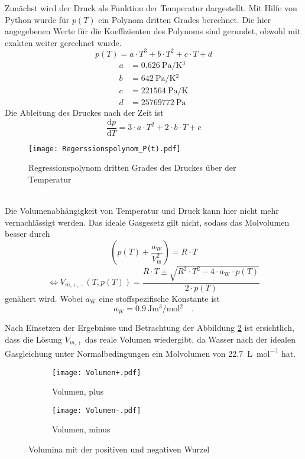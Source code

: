 Zunächst wird der Druck als Funktion der Temperatur dargestellt. Mit Hilfe von Python wurde für $p(T)$ ein Polynom dritten Grades berechnet. Die hier angegebenen Werte für die Koeffizienten des Polynoms sind gerundet, obwohl mit exakten weiter gerechnet wurde.
\begin{equation}
p(T) = a \cdot T ^3 + b \cdot T^2 +c \cdot T + d
\end{equation}
\begin{align}
a &=\SI{0.626}{\pascal\per\kelvin^3}  \\
b &= \SI{642}{\pascal\per\kelvin^2}  \\
c &= \SI{221564}{\pascal\per\kelvin} \\
d  &= \SI{25769772}{\pascal}
\end{align}
Die Ableitung des Druckes nach der Zeit ist
\begin{equation}
\frac{\text{d} p}{\text{d} T} = 3 \cdot a \cdot T^2 + 2 \cdot b \cdot T + c
\end{equation}
\begin{figure}[h!]
	\centering
	\texttt{[image: Regerssionspolynom\_P(t).pdf]}
	\caption{Regressionspolynom dritten Grades des Druckes über der Temperatur}
	\label{fig:Regerssionspolynom_P(t)}
\end{figure}
\\

Die Volumenabhängigkeit von Temperatur und Druck kann hier nicht mehr vernachlässigt werden. Das ideale Gasgesetz gilt nicht, sodass das Molvolumen besser durch
\begin{equation}
\left( p(T) + \frac{a_\text{W}}{V_\text{m}^2}\right) = R \cdot T
\end{equation}
\begin{equation}
\Leftrightarrow
V_{m,+,-}(T, p(T)) = \frac{R \cdot T \pm \sqrt{R^2 \cdot T^2 - 4 \cdot a_\text{W} \cdot p(T)}}{2 \cdot p(T)}
\end{equation}
genähert wird. Wobei $a_\text{W}$ eine stoffspezifische Konstante ist
\begin{equation}
a_\text{W} = \SI{0.9}{\joule\metre^3\per\mol^2} \quad.
\end{equation}

 Nach Einsetzen der Ergebnisse und Betrachtung der Abbildung \ref{fig:volumen} ist ersichtlich, dass die Lösung $V_{m,+}$ das reale Volumen wiedergibt, da Wasser nach der idealen Gasgleichung unter Normalbedingungen ein Molvolumen von \SI{22.7}{\liter\per\mol} hat.
\begin{figure} 
	\centering
	\begin{subfigure}{\textwidth}
		\centering
		\texttt{[image: Volumen+.pdf]}
		\caption{Volumen, plus}
	\end{subfigure}
	\begin{subfigure}{\textwidth}
		\centering
		\texttt{[image: Volumen-.pdf]}
		\caption{Volumen, minus}
	\end{subfigure}
	\caption{Volumina mit der positiven und negativen Wurzel }
	\label{fig:volumen}
\end{figure}


